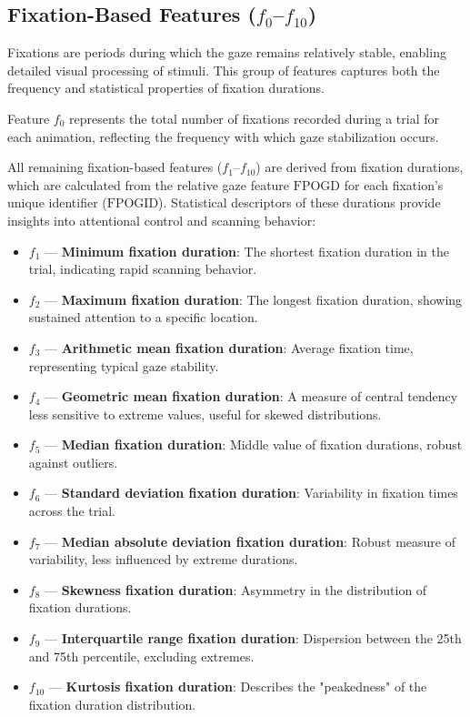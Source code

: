 \documentclass[12pt]{report}
\begin{document}
\subsection[Fixation-Based Features (f0–f10)]{Fixation-Based Features (\(f_0\)–\(f_{10}\))}

Fixations are periods during which the gaze remains relatively stable, enabling detailed visual processing of stimuli. 
This group of features captures both the frequency and statistical properties of fixation durations.  

Feature \(f_0\) represents the total number of fixations recorded during a trial for each animation, reflecting the frequency with which gaze stabilization occurs.  

All remaining fixation-based features (\(f_1\)–\(f_{10}\)) are derived from fixation durations, which are calculated from the relative gaze feature \(\mathrm{FPOGD}\) for each fixation's unique identifier (\(\mathrm{FPOGID}\)). 
Statistical descriptors of these durations provide insights into attentional control and scanning behavior:

\begin{itemize}
    \item \(f_1\) — \textbf{Minimum fixation duration}: The shortest fixation duration in the trial, indicating rapid scanning behavior.
    \item \(f_2\) — \textbf{Maximum fixation duration}: The longest fixation duration, showing sustained attention to a specific location.
    \item \(f_3\) — \textbf{Arithmetic mean fixation duration}: Average fixation time, representing typical gaze stability.
    \item \(f_4\) — \textbf{Geometric mean fixation duration}: A measure of central tendency less sensitive to extreme values, useful for skewed distributions.
    \item \(f_5\) — \textbf{Median fixation duration}: Middle value of fixation durations, robust against outliers.
    \item \(f_6\) — \textbf{Standard deviation fixation duration}: Variability in fixation times across the trial.
    \item \(f_7\) — \textbf{Median absolute deviation fixation duration}: Robust measure of variability, less influenced by extreme durations.
    \item \(f_8\) — \textbf{Skewness fixation duration}: Asymmetry in the distribution of fixation durations.
    \item \(f_9\) — \textbf{Interquartile range fixation duration}: Dispersion between the 25th and 75th percentile, excluding extremes.
    \item \(f_{10}\) — \textbf{Kurtosis fixation duration}: Describes the "peakedness" of the fixation duration distribution.
\end{itemize}
\end{document}
